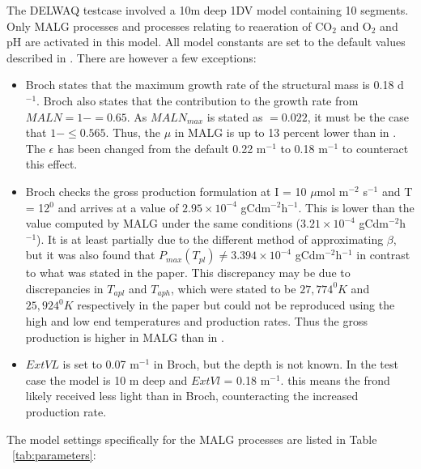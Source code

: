 \documentclass{deltares_manual}
\begin{document}
The DELWAQ testcase involved a 10m deep 1DV model containing 10 segments. Only MALG processes and processes relating to reaeration of CO$_{2}$ and O$_{2}$ and pH are activated in this model. All model constants are set to the default values described in \cite{broch2012}. There are however a few exceptions:
\begin{itemize}
	\item Broch states that the maximum growth rate of the structural mass is 0.18 d$^{-1}$. Broch also states that the contribution to the growth rate from $MALN = 1-  = 0.65$. As $MALN_{max}$ is stated as $= 0.022$, it must be the case that $1- \leq 0.565$. Thus, the $\mu$ in MALG is up to 13 percent lower than in \cite{broch2012}. The $\epsilon$ has been changed from the default 0.22 m$^{-1}$ to 0.18 m$^{-1}$ to counteract this effect.
	\item Broch checks the gross production formulation at I = 10 $\mu$mol m$^{-2}$ s$^{-1}$ and T = 12$^{0}$ and arrives at a value of $2.95 \times 10^{-4}$ gCdm$^{-2}$h$^{-1}$. This is lower than the value computed by MALG under the same conditions ($3.21  \times 10^{-4}$ gCdm$^{-2}$h$^{-1}$). It is at least partially due to the different method of approximating $\beta$, but it was also found that $P_{max}(T_{pl}) \neq 3.394  \times 10^{-4}$ gCdm$^{-2}$h$^{-1}$ in contrast to what was stated in the paper. This discrepancy may be due to discrepancies in $T_{apl}$ and $T_{aph}$, which were stated to be $27,774^{0}K$ and $25,924^{0}K$ respectively in the paper but could not be reproduced using the high and low end temperatures and production rates. Thus the gross production is higher in MALG than in \cite{broch2012}.
	\item $ExtVL$ is set to 0.07 m$^{-1}$ in Broch, but the depth is not known. In the test case the model is 10 m deep and $ExtVl$ = 0.18 m$^{-1}$. this means the frond likely received less light than in Broch, counteracting the increased production rate.
\end{itemize}

The model settings specifically for the MALG processes are listed in Table ~\ref{tab:parameters}:
\end{document}
